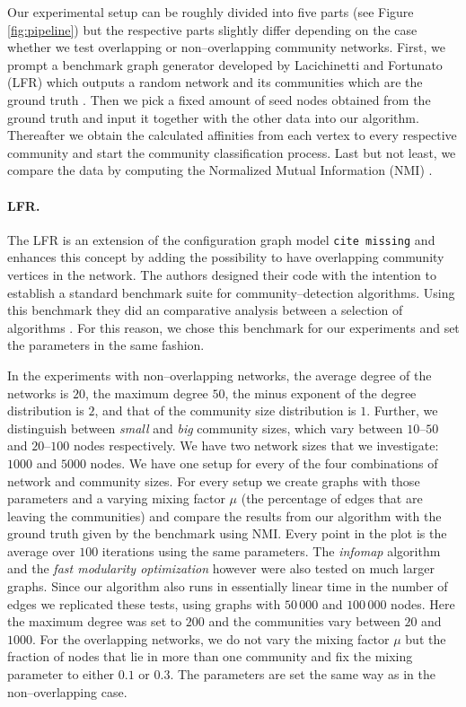 Our experimental setup can be roughly divided into five parts (see Figure \ref{fig:pipeline}) but the respective parts slightly differ depending on the case whether we test overlapping or non--overlapping community networks. First, we prompt a benchmark graph generator developed by Lacichinetti and Fortunato (LFR) \cite{LFR08}\cite{LFR09} which outputs a random network and its communities which are the ground truth . Then we pick a fixed amount of seed nodes obtained from the ground truth and input it together 
with the other data into our algorithm. Thereafter we obtain the calculated 
affinities from each vertex to every respective community and start the 
community classification process. Last but not least, we compare the data by 
computing the Normalized Mutual Information (NMI) \cite{DDDA05}.


\paragraph{LFR.}
The LFR is an extension of the configuration graph model \texttt{cite missing} and enhances this concept by adding the possibility to have overlapping community vertices in the network. The authors designed their code with the intention to establish a standard benchmark suite for community--detection algorithms. Using this benchmark they did an comparative analysis between a selection of algorithms \cite{LF09}. For this reason, we chose this benchmark for our experiments and set the parameters in the same fashion. 

In the experiments with non--overlapping networks, the average degree of the networks is $20$, the maximum degree $50$, the minus exponent of the degree distribution is $2$, and that of the community size distribution is $1$. Further, we distinguish between \textit{small} and \textit{big} community sizes, which vary between $10$--$50$ and $20$--$100$ nodes respectively. We have two network sizes that we investigate: $1000$ and $5000$ nodes. We have one setup for every of the four combinations of network and community sizes. For every setup we create graphs with those parameters and a varying mixing factor $\mu$ (the percentage of edges that are leaving the communities) and compare the results from our algorithm with the ground truth given by the benchmark using NMI. Every point in the plot is the average over $100$ iterations using the same parameters. The \textit{infomap} algorithm \cite{RB08} and the \textit{fast modularity optimization} \cite{BGLL08} however were also tested on much larger graphs. Since our algorithm also runs in essentially linear time in the number of edges we replicated these tests, using graphs with $50\,000$ and $100\,000$ nodes. Here the maximum degree was set to $200$ and the communities vary between $20$ and $1000$. For the overlapping networks, we do not vary the mixing factor $\mu$ but the fraction of nodes that lie in more than one community and fix the mixing parameter to either $0.1$ or $0.3$. The parameters are set the same way as in the non--overlapping case.


